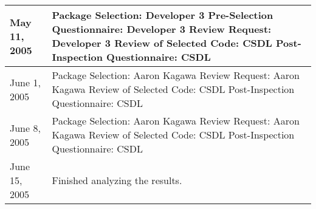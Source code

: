 \begin{table}[htbp]
\begin{center}
\begin{tabular}{|p{5.0cm}|p{8.0cm}|}
May 11, 2005 & Package Selection: Developer 3 \newline
Pre-Selection Questionnaire: Developer 3 \newline
Review Request: Developer 3 \newline
Review of Selected Code: CSDL \newline
Post-Inspection Questionnaire: CSDL \\ \hline

June 1, 2005 & Package Selection: Aaron Kagawa \newline
Review Request: Aaron Kagawa \newline
Review of Selected Code: CSDL \newline
Post-Inspection Questionnaire: CSDL \\ \hline

June 8, 2005 & Package Selection: Aaron Kagawa \newline
Review Request: Aaron Kagawa \newline
Review of Selected Code: CSDL \newline
Post-Inspection Questionnaire: CSDL \\ \hline

June 15, 2005 & Finished analyzing the results.  \\ \hline
    \end{tabular}
  \end{center}
\end{table}
















